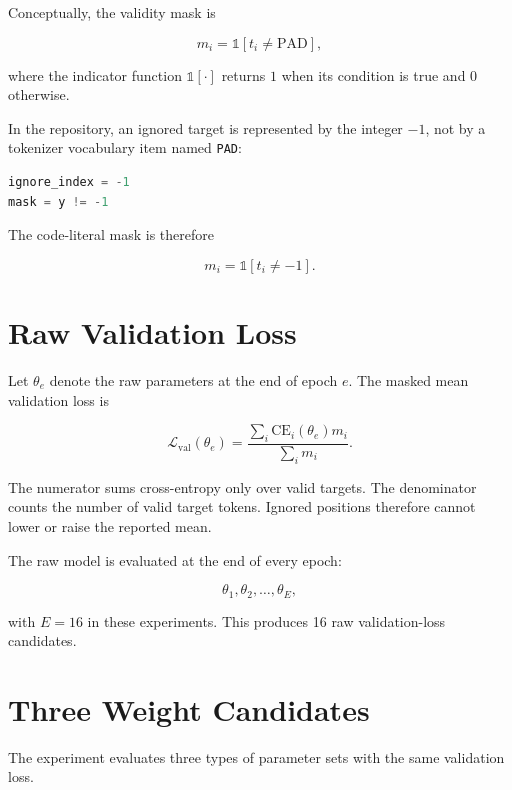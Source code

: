 \documentclass[11pt,a4paper]{article}
\begin{document}
Conceptually, the validity mask is

\begin{equation}
  m_i=\mathbb{1}[t_i\neq\mathrm{PAD}],
\end{equation}

where the indicator function $\mathbb{1}[\cdot]$ returns $1$ when its condition
is true and $0$ otherwise.

In the repository, an ignored target is represented by the integer $-1$, not by
a tokenizer vocabulary item named \texttt{PAD}:

\begin{lstlisting}[language=Python]
ignore_index = -1
mask = y != -1
\end{lstlisting}

The code-literal mask is therefore

\begin{equation}
  m_i=\mathbb{1}[t_i\neq -1].
\end{equation}

\section{Raw Validation Loss}

Let $\theta_e$ denote the raw parameters at the end of epoch $e$. The masked
mean validation loss is

\begin{equation}
  \mathcal{L}_{\mathrm{val}}(\theta_e)
  =
  \frac{\sum_i \mathrm{CE}_i(\theta_e)m_i}
       {\sum_i m_i}.
\end{equation}

The numerator sums cross-entropy only over valid targets. The denominator counts
the number of valid target tokens. Ignored positions therefore cannot lower or
raise the reported mean.

The raw model is evaluated at the end of every epoch:

\begin{equation}
  \theta_1,\theta_2,\ldots,\theta_E,
\end{equation}

with $E=16$ in these experiments. This produces 16 raw validation-loss
candidates.

\section{Three Weight Candidates}

The experiment evaluates three types of parameter sets with the same validation
loss.
\end{document}
